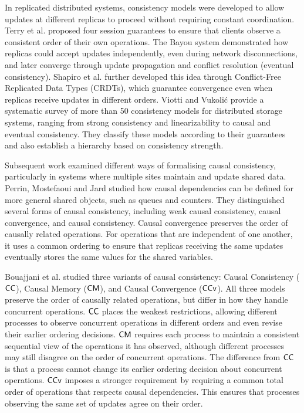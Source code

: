 In replicated distributed systems, consistency models were developed to allow updates at different replicas to proceed without requiring constant coordination. Terry et al. \cite{terry1994session} proposed four session guarantees to ensure that clients observe a consistent order of their own operations. The Bayou system \cite{terry1995bayou} demonstrated how replicas could accept updates independently, even during network disconnections, and later converge through update propagation and conflict resolution (eventual consistency). Shapiro et al. \cite{shapiro2011crdt} further developed this idea through Conflict-Free Replicated Data Types (CRDTs), which guarantee convergence even when replicas receive updates in different orders. Viotti and Vukolić   \cite{viotti2016consistency} provide a systematic survey of more than 50 consistency models for distributed storage systems, ranging from strong consistency and linearizability to causal and eventual consistency. They classify these models according to their guarantees and also establish a hierarchy based on consistency strength.

Subsequent work examined different ways of formalising causal consistency, particularly in systems where multiple sites maintain and update shared data. Perrin, Mostefaoui and Jard \cite{DBLP:journals/corr/PerrinMJ16} studied how causal dependencies can be defined for more general shared objects, such as queues and counters. They distinguished several forms of causal consistency, including weak causal consistency, causal convergence, and causal consistency.  Causal convergence preserves the order of causally related operations. For operations that are independent of one another, it uses a common ordering to ensure that replicas receiving the same updates eventually stores the same values for the shared variables.

Bouajjani et al. \cite{BouajjaniEGH17} studied three variants of causal consistency: Causal Consistency ($\mathsf{CC}$), Causal Memory ($\mathsf{CM}$), and Causal Convergence ($\mathsf{CCv}$). All three models preserve the order of causally related operations, but differ in how they handle concurrent operations. $\mathsf{CC}$ places the weakest restrictions, allowing different processes to observe concurrent operations in different orders and even revise their earlier ordering decisions. $\mathsf{CM}$ requires each process to maintain a consistent sequential view of the operations it has observed, although different processes may still disagree on the order of concurrent operations. The difference from $\mathsf{CC}$ is that a  process cannot change its earlier ordering decision about concurrent operations. $\mathsf{CCv}$ imposes a stronger requirement by requiring a common total order of operations that respects causal dependencies. This ensures that processes observing the same set of updates agree on their order.

